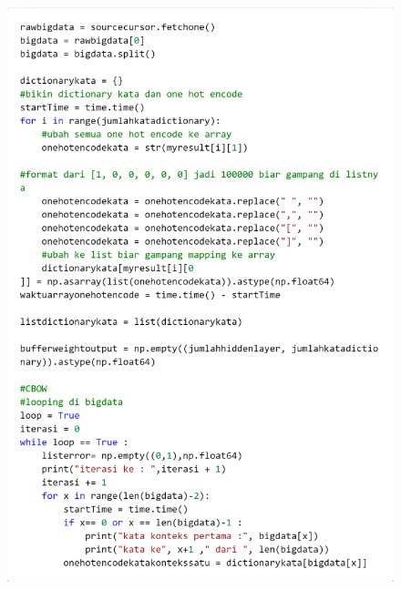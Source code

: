 \documentclass[12pt]{report}
\begin{document}
\begin{figure}[H]
\centering
\includegraphics[scale=0.3]{trainingcbow2}
\end{figure}
\end{document}
